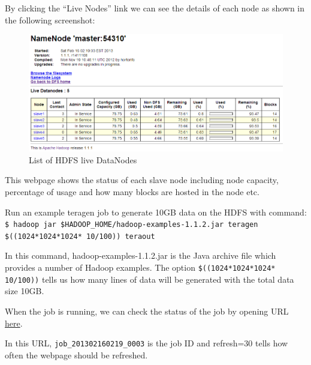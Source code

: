 By clicking the ``Live Nodes'' link we can see the details of each node as shown in the following screenshot:
\begin{figure}[h]
  \centering
  \includegraphics[width=.8\textwidth]{figs/5163OS_03_05.png}
  \caption{List of HDFS live DataNodes}\label{fig:hdfs.datanodes}
\end{figure} 


This webpage shows the status of each slave node including node capacity, percentage of usage and how many blocks are hosted in the node etc.

Run an example teragen job to generate 10GB data on the HDFS with command:\\
\verb|$ hadoop jar $HADOOP_HOME/hadoop-examples-1.1.2.jar teragen $((1024*1024*1024* 10/100)) teraout|

In this command, hadoop-examples-1.1.2.jar is the Java archive file which provides a number of Hadoop examples. The option \verb|$((1024*1024*1024* 10/100))| tells us how many lines of data will be generated with the total data size 10GB.

When the job is running, we can check the status of the job by opening URL \href{http://master:50030/jobdetails.jsp?jobid=job_201302160219_0003&refresh=30}{here}.

In this URL, \verb|job_201302160219_0003| is the job ID and refresh=30 tells how often the webpage should be refreshed.

